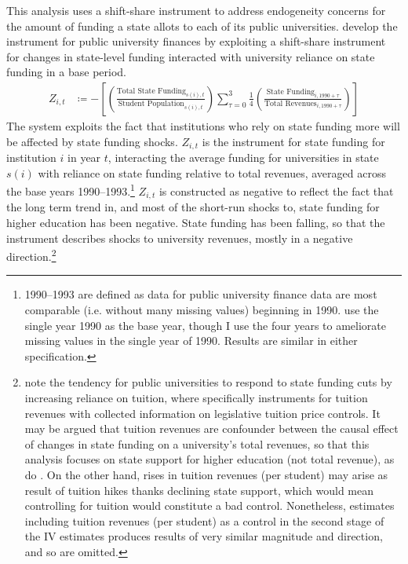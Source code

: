 This analysis uses a shift-share instrument to address endogeneity concerns for the amount of funding a state allots to each of its public universities.
\cite{NBERw23736,NBERw27885} develop the instrument for public university finances by exploiting a shift-share instrument for changes in state-level funding interacted with university reliance on state funding in a base period.
\begin{align}
    \label{eqn:public-instrument}
    Z_{i,t} &\coloneqq - \left[
    \left( \frac{\text{Total State Funding}_{s(i),t}}{\text{Student Population}_{s(i),t}} \right)
    \sum_{\tau = 0}^{3} \frac 14
    \left( \frac{\text{State Funding}_{i,1990 + \tau}}{\text{Total Revenues}_{i,1990 + \tau}} \right) \right]
\end{align}
The system exploits the fact that institutions who rely on state funding more will be affected by state funding shocks.
$Z_{i,t}$ is the instrument for state funding for institution $i$ in year $t$, interacting the average funding for universities in state $s(i)$ with reliance on state funding relative to total revenues, averaged across the base years 1990--1993.\footnote{
    1990--1993 are defined as data for public university finance data are most comparable (i.e. without many missing values) beginning in 1990.
    \cite{NBERw23736} use the single year 1990 as the base year, though I use the four years to ameliorate missing values in the single year of 1990.
    Results are similar in either specification.
}
$Z_{i,t}$ is constructed as negative to reflect the fact that the long term trend in, and most of the short-run shocks to, state funding for higher education has been negative.
State funding has been falling, so that the instrument describes shocks to university revenues, mostly in a negative direction.\footnote{
    \label{foot:control}
    \cite{NBERw27885} note the tendency for public universities to respond to state funding cuts by increasing reliance on tuition, where \cite{NBERw23736} specifically instruments for tuition revenues with collected information on legislative tuition price controls.
    It may be argued that tuition revenues are confounder between the causal effect of changes in state funding on a university's total revenues, so that this analysis focuses on state support for higher education (not total revenue), as do \cite{NBERw27885}.
    On the other hand, rises in tuition revenues (per student) may arise as result of tuition hikes thanks declining state support, which would mean controlling for tuition would constitute a bad control.
    Nonetheless, estimates including tuition revenues (per student) as a control in the second stage of the IV estimates produces results of very similar magnitude and direction, and so are omitted.
}

